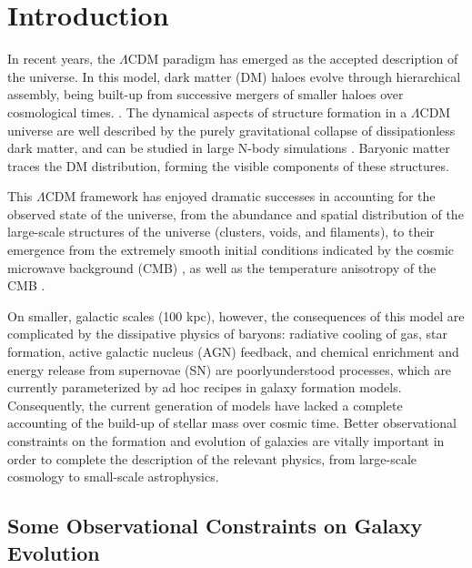 \newcommand\mynote[1]{\textcolor{red}{#1}}
\newcommand\persnote[1]{\textcolor{green}{#1}}

\chapter{Introduction}

In recent years, the $\Lambda$CDM paradigm has emerged as the accepted description of the universe.
In this model, dark matter (DM) haloes evolve through hierarchical assembly, being built-up from successive mergers of smaller haloes over cosmological times. \citep{Gott:1975ab,Press:1974aa,White:1978aa,Blumenthal:1984aa,Davis:1985aa,White:1991aa,Barnes:1992aa,Cole:2000aa}.
The dynamical aspects of structure formation in a $\Lambda$CDM universe are well described by the purely gravitational collapse of dissipationless dark matter, and can be studied in large N-body simulations \citep[e.g.,][]{Springel:2005aa,Thomas:1992aa,Navarro:1995aa,Weinberg:2004aa}.
Baryonic matter traces the DM distribution, forming the visible components of these structures.

This $\Lambda$CDM framework has enjoyed dramatic successes in accounting for the observed state of the universe, from the abundance and spatial distribution of the large-scale structures of the universe (clusters, voids, and filaments), to their emergence from the extremely smooth initial conditions indicated by the cosmic microwave background (CMB) \citep{Springel:2006aa}, as well as the temperature anisotropy of the CMB \citep[][and references therein]{Narlikar:2001aa}.


On smaller, galactic scales (100 kpc), however, the consequences of this model are complicated by the dissipative physics of baryons:
radiative cooling of gas, star formation, active galactic nucleus (AGN) feedback, and chemical enrichment and energy release from supernovae (SN) are poorly\-understood processes, which are currently parameterized by ad hoc recipes in galaxy formation models.
Consequently, the current generation of models have lacked a complete accounting of the build-up of stellar mass over cosmic time.
Better observational constraints on the formation and evolution of galaxies are vitally important in order to complete the description of the relevant physics, from large-scale cosmology to small-scale astrophysics.

\section{Some Observational Constraints on Galaxy Evolution}
